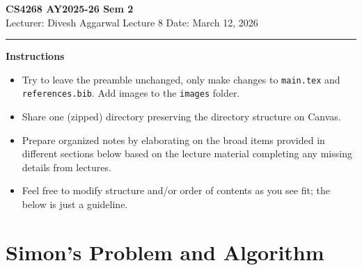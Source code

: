



% 


\newpage
\noindent
\textbf{CS4268 AY2025-26 Sem 2}
\\
\noindent
Lecturer: Divesh Aggarwal
\hfill
Lecture 8                      %
\hfill
Date: March 12, 2026          %


\noindent
\rule{\textwidth}{1pt}

\medskip


\textbf{Instructions}\\
\begin{itemize}
    \item Try to leave the preamble unchanged, only make changes to \texttt{main.tex} and  \texttt{references.bib}. Add images to the \texttt{images} folder. 
    \item Share one (zipped) directory preserving the directory structure on Canvas. 
    \item Prepare organized notes by elaborating on the broad items provided in different sections below based on the lecture material completing any missing details from lectures.
    \item Feel free to modify structure and/or order of contents as you see fit; the below is just a guideline.
\end{itemize} 


\section{Simon's Problem and Algorithm}

